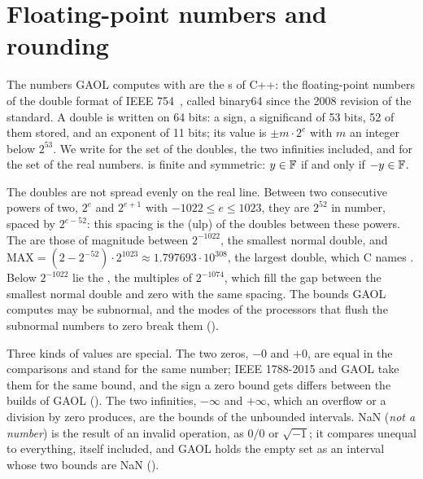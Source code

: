 \section{Floating-point numbers and rounding}\label{sec:rounding-definitions}
%

The numbers GAOL computes with are the s of C++: the
floating-point numbers of the double format of IEEE
754~\cite{IEEE754:2008,Goldberg:01}, called binary64 since the 2008 revision
of the standard. A double is written on 64 bits: a sign, a significand of
53 bits, 52 of them stored, and an exponent of 11 bits; its value is
$\pm m\cdot2^{e}$ with $m$ an integer below $2^{53}$. We write \FSet{} for
the set of the doubles, the two infinities included, and \RSet{} for the set
of the real numbers. \FSet{} is finite and symmetric: $y\in\mathbb{F}$ if and
only if $-y\in\mathbb{F}$.

\medskip
The doubles are not spread evenly on the real line. Between two consecutive
powers of two, $2^{e}$ and $2^{e+1}$ with $-1022\leq e\leq1023$, they are $2^{52}$ in number, spaced by
$2^{e-52}$: this spacing is the  (ulp) of the
doubles between these powers. The  are those of
magnitude between $2^{-1022}$, the smallest normal double, and
$\mathrm{MAX}=(2-2^{-52})\cdot2^{1023}\approx1.797693\cdot10^{308}$, the
largest double, which C names . Below $2^{-1022}$ lie the
, the multiples of $2^{-1074}$, which fill the gap
between the smallest normal double and zero with the same spacing. The
bounds GAOL computes may be subnormal, and the modes of the processors that
flush the subnormal numbers to zero break them ().
%

\medskip
Three kinds of values are special. The two zeros, $-0$ and $+0$, are equal in the
comparisons and stand for the same number; IEEE 1788-2015 and GAOL take them
for the same bound, and the sign a zero bound gets differs between the
builds of GAOL (). The two infinities, $-\infty$ and
$+\infty$, which an overflow or a division by zero produces, are the bounds
of the unbounded intervals. NaN (\emph{not a number}) is the result of an
invalid operation, as $0/0$ or $\sqrt{-1}$; it compares unequal to
everything, itself included, and GAOL holds the empty set as an interval
whose two bounds are NaN ().
%

